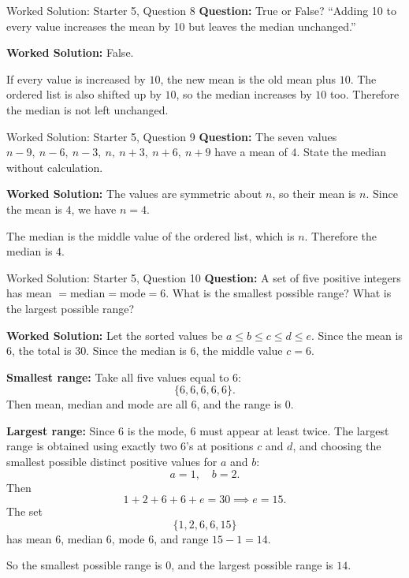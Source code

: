 \documentclass{beamer}
\begin{document}
\begin{frame}{Worked Solution: Starter 5, Question 8}
\small
\textbf{Question:} True or False? ``Adding 10 to every value increases the mean by 10 but leaves the median unchanged.''

\smallskip
\textbf{Worked Solution:} False.

If every value is increased by \(10\), the new mean is the old mean plus \(10\). The ordered list is also shifted up by \(10\), so the median increases by \(10\) too. Therefore the median is not left unchanged.
\end{frame}

\begin{frame}{Worked Solution: Starter 5, Question 9}
\small
\textbf{Question:} The seven values \(n-9,\ n-6,\ n-3,\ n,\ n+3,\ n+6,\ n+9\) have a mean of \(4\). State the median without calculation.

\smallskip
\textbf{Worked Solution:} The values are symmetric about \(n\), so their mean is \(n\). Since the mean is \(4\), we have \(n=4\).

The median is the middle value of the ordered list, which is \(n\). Therefore the median is \(4\).
\end{frame}

\begin{frame}{Worked Solution: Starter 5, Question 10}
\small
\textbf{Question:} A set of five positive integers has mean \(= \text{median} = \text{mode} = 6\). What is the smallest possible range? What is the largest possible range?

\smallskip
\textbf{Worked Solution:} Let the sorted values be \(a\le b\le c\le d\le e\). Since the mean is \(6\), the total is \(30\). Since the median is \(6\), the middle value \(c=6\).

\textbf{Smallest range:} Take all five values equal to \(6\):
\[
\{6,6,6,6,6\}.
\]
Then mean, median and mode are all \(6\), and the range is \(0\).

\textbf{Largest range:} Since \(6\) is the mode, \(6\) must appear at least twice. The largest range is obtained using exactly two \(6\)'s at positions \(c\) and \(d\), and choosing the smallest possible distinct positive values for \(a\) and \(b\):
\[
a=1,\quad b=2.
\]
Then
\[
1+2+6+6+e=30 \implies e=15.
\]
The set
\[
\{1,2,6,6,15\}
\]
has mean \(6\), median \(6\), mode \(6\), and range \(15-1=14\).

So the smallest possible range is \(0\), and the largest possible range is \(14\).
\end{frame}
\end{document}
